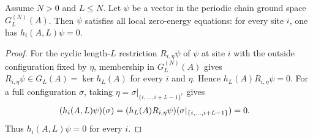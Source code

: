 \begin{lemma}
    \label{thm:chain_ground_space_implies_frustration_free}
    \leanok
    Assume $N>0$ and $L\le N$. Let $\psi$ be a vector in the periodic chain
    ground space $G_L^{(N)}(A)$. Then $\psi$ satisfies all local zero-energy
    equations: for every site $i$, one has $h_i(A,L)\psi=0$.
\end{lemma}

\begin{proof}
    \leanok
    For the cyclic length-$L$ restriction $R_{i,\eta}\psi$ of $\psi$ at
    site $i$ with the outside configuration fixed by $\eta$, membership in
    $G_L^{(N)}(A)$ gives
    $R_{i,\eta}\psi\in G_L(A)=\ker h_L(A)$ for every $i$ and $\eta$. Hence
    $h_L(A)R_{i,\eta}\psi=0$. For a full configuration $\sigma$, taking
    $\eta=\sigma|_{\{i,\ldots,i+L-1\}^c}$ gives
    \begin{align}
        (h_i(A,L)\psi)(\sigma)
         & =
        (h_L(A)R_{i,\eta}\psi)
        (\sigma|_{\{i,\ldots,i+L-1\}}) =0.
        \notag
    \end{align}
    Thus $h_i(A,L)\psi=0$ for every $i$.
\end{proof}
